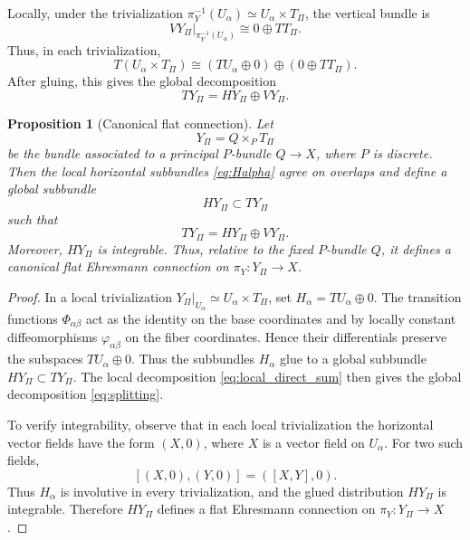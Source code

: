 \documentclass[11pt]{amsart}
\theoremstyle{plain}
\newtheorem{proposition}{Proposition}[section]
\theoremstyle{definition}
\theoremstyle{remark}
\begin{document}
Locally, under the trivialization 
\(\pi_Y^{-1}(U_\alpha)\simeq U_\alpha\times T_\Pi\), the vertical bundle is
\begin{equation}
	VY_\Pi|_{\pi_Y^{-1}(U_\alpha)}
	\cong
	0\oplus TT_\Pi.
	\label{eq:vertical_local}
\end{equation}
Thus, in each trivialization,
\begin{equation}
	T(U_\alpha\times T_\Pi)
	\cong
	(TU_\alpha\oplus 0)\oplus (0\oplus TT_\Pi).
	\label{eq:local_direct_sum}
\end{equation}
After gluing, this gives the global decomposition
\begin{equation}
	TY_\Pi = HY_\Pi \oplus VY_\Pi.
	\label{eq:splitting}
\end{equation}

\begin{proposition}[Canonical flat connection]
	\label{prop:ehresmann}
	Let
	\[
	Y_\Pi=Q\times_P T_\Pi
	\]
	be the bundle associated to a principal \(P\)-bundle \(Q\to X\), where \(P\) is discrete. 
	Then the local horizontal subbundles \eqref{eq:Halpha} agree on overlaps and define a global subbundle
	\[
	HY_\Pi\subset TY_\Pi
	\]
	such that
	\[
	TY_\Pi=HY_\Pi\oplus VY_\Pi.
	\]
	Moreover, \(HY_\Pi\) is integrable. 
	Thus, relative to the fixed \(P\)-bundle \(Q\), it defines a canonical flat Ehresmann connection on \(\pi_Y:Y_\Pi\to X\).
\end{proposition}

\begin{proof}
	In a local trivialization \(Y_\Pi|_{U_\alpha}\simeq U_\alpha\times T_\Pi\), set \(H_\alpha=TU_\alpha\oplus 0\). 
	The transition functions \(\Phi_{\alpha\beta}\) act as the identity on the base coordinates and by locally constant diffeomorphisms \(\varphi_{\alpha\beta}\) on the fiber coordinates. 
	Hence their differentials preserve the subspaces \(TU_\alpha\oplus 0\). 
	Thus the subbundles \(H_\alpha\) glue to a global subbundle \(HY_\Pi\subset TY_\Pi\). 
	The local decomposition \eqref{eq:local_direct_sum} then gives the global decomposition \eqref{eq:splitting}.
	
	To verify integrability, observe that in each local trivialization the horizontal vector fields have the form \((X,0)\), where \(X\) is a vector field on \(U_\alpha\). 
	For two such fields,
	\[
	[(X,0),(Y,0)] = ([X,Y],0).
	\]
	Thus \(H_\alpha\) is involutive in every trivialization, and the glued distribution \(HY_\Pi\) is integrable. 
	Therefore \(HY_\Pi\) defines a flat Ehresmann connection on \(\pi_Y:Y_\Pi\to X\).
\end{proof}
\end{document}
